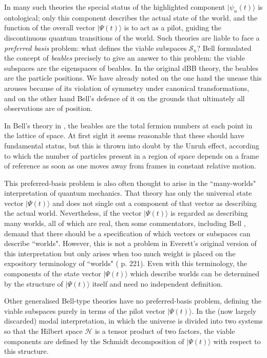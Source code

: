 \documentclass[12pt,a4paper,reqno]{article}
\renewcommand{\(}{\left(}
\renewcommand{\)}{\right)}
\renewcommand{\.}{\centerdot}
\renewcommand{\S}{\mathcal{S}}
\renewcommand{\H}{\mathcal{H}}
\newcommand{\1}{\mathbf{1}}
\newcommand{\<}{\langle}
\renewcommand{\>}{\rangle}
\theoremstyle{definition}
\theoremstyle{remark}
\numberwithin{equation}{section}
\begin{document}
In many such theories the special status of the highlighted component $|\psi_n(t)\>$ is ontological; only this component describes the actual state of the world, and the function of the overall vector $|\Psi(t)\>$ is to act as a pilot, guiding the discontinuous quantum transitions of the world. Such theories are liable to face a \emph{preferred basis} problem: what defines the viable subspaces $\S_n$? Bell formulated the concept of \emph{beables} precisely to give an answer to this problem: the viable subspaces are the eigenspaces of beables. In the original dBB theory, the beables are the particle positions. We have already noted on the one hand the unease this arouses because of its violation of symmetry under canonical transformations, and on the other hand Bell's defence of it on the grounds that ultimately all observations are of position. %

In Bell's theory in \cite{Bell:beables}, the beables are the total fermion numbers at each point in the lattice of space. At first sight it seems reasonable that these should have fundamental status, but this is thrown into doubt by the Unruh effect, according to which the number of particles present in a region of space depends on a frame of reference as soon as one moves away from frames in constant relative motion.

This preferred-basis problem is also often thought to arise in the ``many-worlds" interpretation of quantum mechanics. That theory has only the universal state vector $|\Psi(t)\>$ and does not single out a component of that vector as describing the actual world. Nevertheless, if the vector $|\Psi(t)\>$ is regarded as describing many worlds, all of which are real, then some commentators, including Bell \cite{Bell:sixworlds}, demand that there should be a specification of which vectors or subspaces can describe ``worlds". However, this is not a problem in Everett's original version \cite{Everett} of this interpretation but only arises when too much weight is placed on the expository terminology of ``worlds" (\cite{QMPN} p. 221). Even with this terminology, the components of the state vector $|\Psi(t)\>$ which describe worlds can be determined by the structure of $|\Psi(t)\>$ itself \cite{Wallace:multiverse} and need no independent definition.

Other generalised Bell-type theories have no preferred-basis problem, defining the viable subspaces purely in terms of the pilot vector $|\Psi(t)\>$. In the (now largely discarded) modal interpretation, in which the universe is divided into two systems so that the Hilbert space $\H$ is a tensor product of two factors, the viable components are defined by the Schmidt decomposition of $|\Psi(t)\>$ with respect to this structure. 
\end{document}

